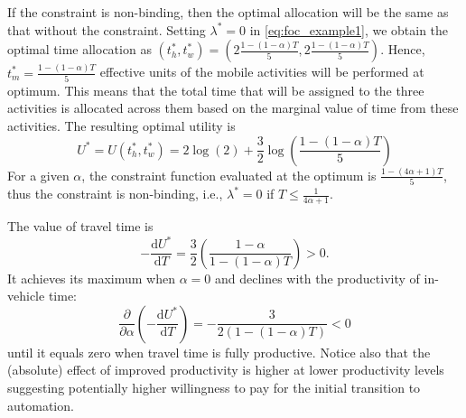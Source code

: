 \documentclass[12pt,a4paper,british]{article}
\begin{document}
\begin{casenv}
	\item If the constraint is non-binding, then the optimal allocation will be the same as that without the constraint. Setting $\lambda^{\ast}=0$ in \eqref{eq:foc_example1}, we obtain the optimal time allocation as $\left( t_{h}^{\ast}, t_{w}^{\ast} \right) = \left(2\frac{1-\left(1 - \alpha \right)T} {5}, 2\frac{1-\left(1 - \alpha \right)T} {5}\right)$. Hence, $t_{m}^{\ast} = \frac{1-\left(1-\alpha\right)T} {5}$ effective units of the mobile activities will be performed at optimum. This means that the total time that will be assigned to the three activities is allocated across them based on the marginal value of time from these activities. The resulting optimal utility is %
	\begin{equation*}
	U^{\ast} = U \left(t_h^{\ast}, t_w^{\ast}\right) = 2\log (2) +  \frac{3}{2}\log\left(\frac{1-\left(1-\alpha\right)T}{5}\right)
	\end{equation*}
	For a given $ \alpha $, the constraint function evaluated at the optimum is $\frac{1-(4\alpha + 1)T}{5}$, thus the constraint is non-binding, i.e., $\lambda^{\ast}=0$ if $T \leq \frac{1}{4\alpha + 1}$.

	The value of travel time is
	\begin{equation*}
	- \frac{\mathrm{d}U^{\ast}}{\mathrm{d}T} = \frac{3}{2} \left( \frac{1-\alpha}{1-\left(1-\alpha\right)T} \right) > 0.
	\end{equation*}
	It achieves its maximum when $\alpha=0$ and declines with the productivity of in-vehicle time:
	\begin{equation*}
		\frac{\partial}{\partial\alpha}\left(-\frac{\mathrm{d}U^{\ast}}{\mathrm{d}T}\right)=-\frac{3}{2\left(1-\left(1-\alpha\right)T\right)} < 0
	\end{equation*} %
	until it equals zero when travel time is fully productive. Notice also that the (absolute) effect of improved productivity is higher at lower productivity levels suggesting potentially higher willingness to pay for the initial transition to automation. 


\end{casenv}
\end{document}
